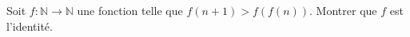 Soit $f : \mathbb{N} \to \mathbb{N}$ une fonction telle que $f(n+1) > f(f(n))$. Montrer que $f$ est l'identité.
